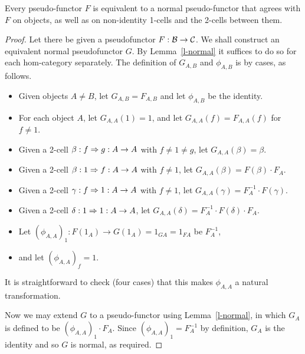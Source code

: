 \documentclass{robinthesisdraft}
\newcommand\defeqto{=}
\begin{document}
\begin{propn}\label{prop-normal}
	Every pseudo-functor $F$ is equivalent to a normal pseudo-functor
	that agrees with $F$ on objects, as well as on non-identity 1-cells and
	the 2-cells between them.
\end{propn}
\begin{proof}
	Let there be given a pseudofunctor $F:\mathcal{B}\to\mathcal{C}$. We shall
	construct an equivalent normal pseudofunctor $G$. By Lemma~\ref{l-normal}
	it suffices to do so for each hom-category separately. The definition
	of $G_{A,B}$ and $\phi_{A,B}$ is by cases, as follows.
	\begin{itemize}
		\item Given objects $A\neq B$, let $G_{A,B} \defeqto F_{A,B}$
			and let $\phi_{A,B}$ be the identity.
		\item For each object $A$, let $G_{A,A}(1) \defeqto 1$, and let
			$G_{A,A}(f) \defeqto F_{A,A}(f)$ for $f \neq 1$.
		\item Given a 2-cell $\beta:f\Rightarrow g: A\to A$ with $f\neq1\neq g$,
			let $G_{A,A}(\beta) \defeqto \beta$.
		\item Given a 2-cell $\beta:1\Rightarrow f: A\to A$ with $f\neq 1$,
			let $G_{A,A}(\beta) \defeqto F(\beta)\cdot F_A$.
		\item Given a 2-cell $\gamma:f\Rightarrow 1: A\to A$ with $f\neq 1$,
			let $G_{A,A}(\gamma) \defeqto F_A^{-1}\cdot F(\gamma)$.
		\item Given a 2-cell $\delta: 1\Rightarrow 1: A\to A$,
			let $G_{A,A}(\delta) \defeqto F_A^{-1}\cdot F(\delta)\cdot F_A$.
		\item Let $(\phi_{A,A})_1: F(1_A)\to G(1_A) = 1_{GA} = 1_{FA}$ be $F_A^{-1}$,
		\item and let $(\phi_{A,A})_f \defeqto 1$.
	\end{itemize}
	It is straightforward to check (four cases) that this
	makes $\phi_{A,A}$ a natural transformation.
	
	Now we may extend $G$ to a pseudo-functor using Lemma~\ref{l-normal},
	in which $G_A$ is defined to be $(\phi_{A,A})_1\cdot F_A$. Since
	$(\phi_{A,A})_1 = F_A^{-1}$ by definition, $G_A$ is the identity and
	so $G$ is normal, as required.
\end{proof}


\end{document}
